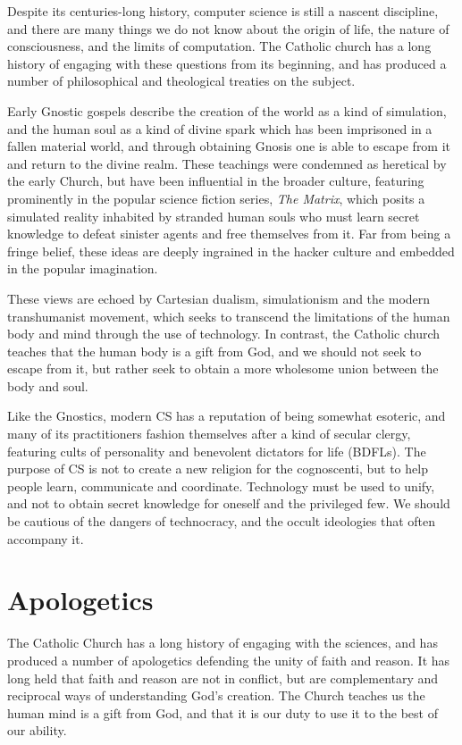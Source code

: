 \documentclass[sigplan,nonacm]{acmart}\settopmatter{printfolios=false,printccs=false,printacmref=false}
\begin{document}
  Despite its centuries-long history, computer science is still a nascent discipline, and there are many things we do not know about the origin of life, the nature of consciousness, and the limits of computation. The Catholic church has a long history of engaging with these questions from its beginning, and has produced a number of philosophical and theological treaties on the subject.

  Early Gnostic gospels describe the creation of the world as a kind of simulation, and the human soul as a kind of divine spark which has been imprisoned in a fallen material world, and through obtaining Gnosis one is able to escape from it and return to the divine realm. These teachings were condemned as heretical by the early Church, but have been influential in the broader culture, featuring prominently in the popular science fiction series, \textit{The Matrix}, which posits a simulated reality inhabited by stranded human souls who must learn secret knowledge to defeat sinister agents and free themselves from it. Far from being a fringe belief, these ideas are deeply ingrained in the hacker culture and embedded in the popular imagination.

  These views are echoed by Cartesian dualism, simulationism and the modern transhumanist movement, which seeks to transcend the limitations of the human body and mind through the use of technology. In contrast, the Catholic church teaches that the human body is a gift from God, and we should not seek to escape from it, but rather seek to obtain a more wholesome union between the body and soul.

  Like the Gnostics, modern CS has a reputation of being somewhat esoteric, and many of its practitioners fashion themselves after a kind of secular clergy, featuring cults of personality and benevolent dictators for life (BDFLs). The purpose of CS is not to create a new religion for the cognoscenti, but to help people learn, communicate and coordinate. Technology must be used to unify, and not to obtain secret knowledge for oneself and the privileged few. We should be cautious of the dangers of technocracy, and the occult ideologies that often accompany it.

  \section{Apologetics}

  The Catholic Church has a long history of engaging with the sciences, and has produced a number of apologetics defending the unity of faith and reason. It has long held that faith and reason are not in conflict, but are complementary and reciprocal ways of understanding God's creation. The Church teaches us the human mind is a gift from God, and that it is our duty to use it to the best of our ability.
\end{document}
